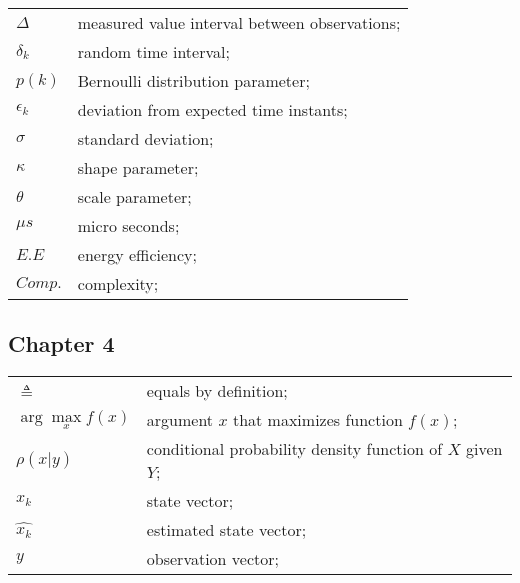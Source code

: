\begin{longtable}{ll}
	$\Delta$				& measured value interval between observations; \\
	$\delta_k$				& random time interval; \\
	
	$p(k)$					& Bernoulli distribution parameter; \\
	$\epsilon_k$			& deviation from expected time instants; \\
	$\sigma$				& standard deviation; \\
	$\kappa$				& shape parameter; \\
	$\theta$				& scale parameter; \\
	
	$\mu s$					& micro seconds; \\
	$E.E$					& energy efficiency; \\
	$Comp.$					& complexity; \\

\end{longtable}


\subsection*{Chapter 4}

\begin{longtable}{ll}
	
	
	$\triangleq$			& equals by definition; \\	
	$\operatorname{arg}  
	\underset{x}
	{\operatorname{max}} 
					f(x)$	& argument $x$ that maximizes function $f(x)$; \\ 
					
	$\rho(x|y)$				& conditional probability density function of $X$ given $Y$; \\
	$x_k$						& state vector; \\
	$\hat{x_k}$				& estimated state vector; \\
	$y$						& observation vector; \\
	
%
	
	
\end{longtable}



